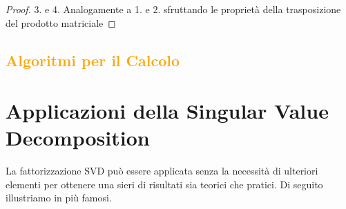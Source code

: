 \documentclass[11pt]{article}
\begin{document}
\begin{proof}{3. e 4.}
Analogamente a 1. e 2. sfruttando le proprietà della trasposizione del prodotto matriciale
\end{proof}

\textcolor{orange}{\subsection{Algoritmi per il Calcolo}}

\newpage
\section{Applicazioni della Singular Value Decomposition}
La fattorizzazione SVD può essere applicata senza la necessità di ulteriori elementi per ottenere una sieri di risultati sia teorici che pratici. 
Di seguito illustriamo in più famosi.
\end{document}
